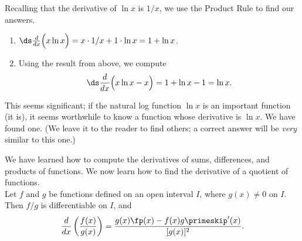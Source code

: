 {Recalling that the derivative of $\ln x$ is $1/x$, we use the Product Rule to find our answers.
\begin{enumerate}
	\item	$\ds \frac{d}{dx}\Big(x\ln x\Big) = x\cdot 1/x + 1\cdot \ln x = 1+\ln x$. 
	\item	Using the result from above, we compute
	\[\ds \frac{d}{dx}\Big(x\ln x-x\Big) = 1+\ln x-1 = \ln x.\]
\end{enumerate}
This seems significant; if the natural log function $\ln x$ is an important function (it is), it seems worthwhile to know a function whose derivative is $\ln x$. We have found one. (We leave it to the reader to find others; a correct answer will be \textit{very} similar to this one.)}

We have learned how to compute the derivatives of sums, differences, and products of functions. We now learn how to find the derivative of a quotient of functions.\\

{Let $f$ and $g$ be functions defined on an open interval $I$, where $g(x) \neq 0$ on $I$. Then $f/g$ is differentiable on $I$, and \[\frac{d}{dx}\left(\frac{f(x)}{g(x)}\right) = \frac{g(x)\fp(x) - f(x)g\primeskip'(x)}{[g(x)]^2}.\]}



